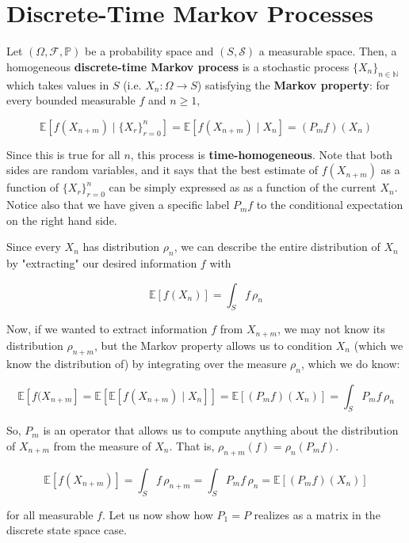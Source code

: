 \documentclass{article}
\begin{document}
\section{Discrete-Time Markov Processes}

  \begin{definition}[DTMP]
    Let $(\Omega, \mathcal{F}, \mathbb{P})$ be a probability space and $(S, \mathcal{S})$ a measurable space. Then, a homogeneous \textbf{discrete-time Markov process} is a stochastic process $\{X_n\}_{n \in \mathbb{N}}$ which takes values in $S$ (i.e. $X_n: \Omega \rightarrow S$) satisfying the \textbf{Markov property}: for every bounded measurable $f$ and $n \geq 1$, 

      \[\mathbb{E}[f(X_{n + m}) \mid \{X_r\}_{r=0}^n] = \mathbb{E}[f (X_{n + m}) \mid X_n] = (P_m f) (X_n)\]

    Since this is true for all $n$, this process is \textbf{time-homogeneous}. Note that both sides are random variables, and it says that the best estimate of $f(X_{n+m})$ as a function of $\{X_r\}_{r=0}^n$ can be simply expressed as as a function of the current $X_n$. Notice also that we have given a specific label $P_m f$ to the conditional expectation on the right hand side. 
  \end{definition}

  Since every $X_n$ has distribution $\rho_n$, we can describe the entire distribution of $X_n$ by "extracting" our desired information $f$ with 

    \[\mathbb{E}[f(X_n)] = \int_S f \, \rho_n\]

  Now, if we wanted to extract information $f$ from $X_{n + m}$, we may not know its distribution $\rho_{n + m}$, but the Markov property allows us to condition $X_n$ (which we know the distribution of) by integrating over the measure $\rho_n$, which we do know: 

    \[\mathbb{E}[f(X_{n + m}] = \mathbb{E}[ \mathbb{E}[f(X_{n + m}) \mid X_n]] = \mathbb{E}[(P_m f) (X_n)] = \int_S P_m f \, \rho_n\]

  So, $P_m$ is an operator that allows us to compute anything about the distribution of $X_{n + m}$ from the measure of $X_n$. That is, $\rho_{n + m} (f) = \rho_n (P_m f)$. 

    \[\mathbb{E}[f(X_{n + m})] = \int_S f \, \rho_{n + m} = \int_S P_m f \, \rho_n = \mathbb{E}[ (P_m f) (X_n)]\] 

  for all measurable $f$. Let us now show how $P_1 = P$ realizes as a matrix in the discrete state space case. 
\end{document}
